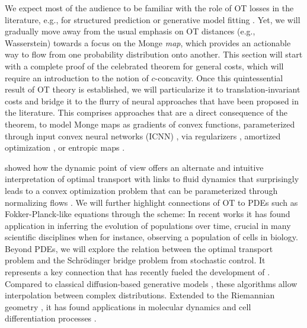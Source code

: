 We expect most of the audience to be familiar with the role of OT losses in the literature, e.g., for structured prediction \citep{frogner2015learning,janati2020multi} or generative model fitting \citep{yang2018scalable, arjovsky2017wasserstein, salimans2018improving, genevay2018learning}. Yet, we will gradually move away from the usual emphasis on OT distances (e.g., Wasserstein) towards a focus on the Monge \textit{map}, which provides an actionable way to flow from one probability distribution onto another. This section will start with a complete proof of the celebrated \citeauthor{Brenier1987} theorem for general costs, which will require an introduction to the notion of $c$-concavity. Once this quintessential result of OT theory is established, we will particularize it to translation-invariant costs and bridge it to the flurry of neural approaches that have been proposed in the literature. 
This comprises approaches that are a direct consequence of the \citeauthor{Brenier1987} theorem, to model Monge maps as gradients of convex functions, parameterized through input convex neural networks (ICNN) \citep{amos2017input, huang2021convex, makkuva2020optimal, korotin2021neural, lubeck2022neural, bunne2022supervised}, via regularizers \citep{uscidda2023monge}, amortized optimization \citep{amos2022amortizing, amos2022meta}, or entropic maps \citep{pooladian2021entropic, pooladian2023minimax, divol2022optimal, cuturi2023monge}.


\citet*{benamou2000computational} showed how the dynamic point of view offers an alternate and intuitive interpretation of optimal transport with links to fluid dynamics that surprisingly leads to a convex optimization problem that can be parameterized through normalizing flows \citep{tong2020trajectorynet}.
We will further highlight connections of OT to PDEs such as Fokker-Planck-like equations through the \citeauthor*{jordan1998variational} scheme: In recent works \citep{bunne2022proximal, alvarez2021optimizing, mokrov2021large, benamou2016augmented} 
it has found application in inferring the evolution of populations over time, crucial in many scientific disciplines when for instance, observing a population of cells in biology.
Beyond PDEs, we will explore the relation between the optimal transport problem and the Schr\"odinger bridge problem from stochastic control. It represents a key connection that has recently fueled the development of  \citep{de2021diffusion, chen2021stochastic, bunne2022recovering, liu2022deep}. Compared to classical diffusion-based generative models \citep{daniels2021score, song2020score}, these algorithms allow interpolation between complex distributions. Extended to the Riemannian geometry \citep{thornton2022riemannian, de2022riemannian}, it has found applications in molecular dynamics \citep{holdijk2022path} and cell differentiation processes \citep{tong2023conditional, bunne2022recovering}.
